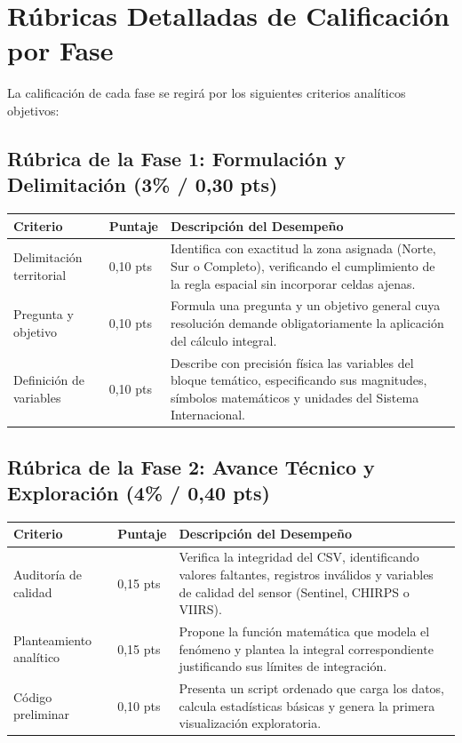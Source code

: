 \documentclass[11pt,a4paper]{article}
\begin{document}
\section{Rúbricas Detalladas de Calificación por Fase}

La calificación de cada fase se regirá por los siguientes criterios analíticos objetivos:

\subsection{Rúbrica de la Fase 1: Formulación y Delimitación (3\% / 0,30 pts)}
\begin{tabularx}{\textwidth}{L{2.8cm} C{2.0cm} Y}
\toprule
\textbf{Criterio} & \textbf{Puntaje} & \textbf{Descripción del Desempeño} \\
\midrule
Delimitación territorial & 0,10 pts & Identifica con exactitud la zona asignada (Norte, Sur o Completo), verificando el cumplimiento de la regla espacial sin incorporar celdas ajenas. \\
Pregunta y objetivo & 0,10 pts & Formula una pregunta y un objetivo general cuya resolución demande obligatoriamente la aplicación del cálculo integral. \\
Definición de variables & 0,10 pts & Describe con precisión física las variables del bloque temático, especificando sus magnitudes, símbolos matemáticos y unidades del Sistema Internacional. \\
\bottomrule
\end{tabularx}

\vspace{0.15cm}

\subsection{Rúbrica de la Fase 2: Avance Técnico y Exploración (4\% / 0,40 pts)}
\begin{tabularx}{\textwidth}{L{2.8cm} C{2.0cm} Y}
\toprule
\textbf{Criterio} & \textbf{Puntaje} & \textbf{Descripción del Desempeño} \\
\midrule
Auditoría de calidad & 0,15 pts & Verifica la integridad del CSV, identificando valores faltantes, registros inválidos y variables de calidad del sensor (Sentinel, CHIRPS o VIIRS). \\
Planteamiento analítico & 0,15 pts & Propone la función matemática que modela el fenómeno y plantea la integral correspondiente justificando sus límites de integración. \\
Código preliminar & 0,10 pts & Presenta un script ordenado que carga los datos, calcula estadísticas básicas y genera la primera visualización exploratoria. \\
\bottomrule
\end{tabularx}
\end{document}
